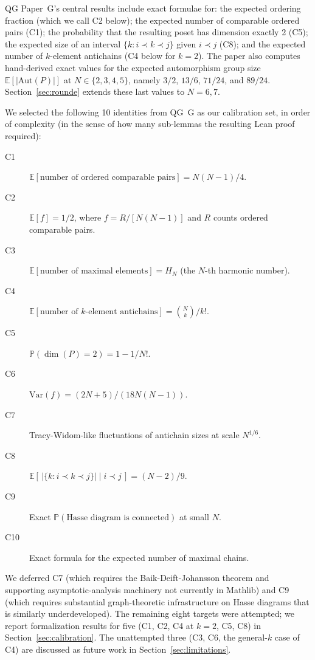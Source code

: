\documentclass[11pt]{article}
\theoremstyle{definition}
\begin{document}
QG Paper~G's central results include exact formulae for: the expected ordering
fraction (which we call C2 below); the expected number of comparable ordered pairs
(C1); the probability that the resulting poset has dimension exactly 2 (C5); the
expected size of an interval $\{ k : i \prec k \prec j \}$ given $i \prec j$ (C8);
and the expected number of $k$-element antichains (C4 below for $k = 2$). The paper
also computes hand-derived exact values for the expected automorphism group size
$\mathbb{E}[|\mathrm{Aut}(P)|]$ at $N \in \{2, 3, 4, 5\}$, namely $3/2$, $13/6$,
$71/24$, and $89/24$. Section~\ref{sec:rounde} extends these last values to $N=6, 7$.

We selected the following 10 identities from QG~G as our calibration set, in
order of complexity (in the sense of how many sub-lemmas the resulting Lean proof
required):

\begin{description}
    \item[C1] $\mathbb{E}[\text{number of ordered comparable pairs}] = N(N-1)/4$.
    \item[C2] $\mathbb{E}[f] = 1/2$, where $f = R/[N(N-1)]$ and $R$ counts ordered
    comparable pairs.
    \item[C3] $\mathbb{E}[\text{number of maximal elements}] = H_N$
    (the $N$-th harmonic number).
    \item[C4] $\mathbb{E}[\text{number of $k$-element antichains}] = \binom{N}{k}/k!$.
    \item[C5] $\mathbb{P}(\dim(P) = 2) = 1 - 1/N!$.
    \item[C6] $\mathrm{Var}(f) = (2N+5)/(18N(N-1))$.
    \item[C7] Tracy-Widom-like fluctuations of antichain sizes at scale $N^{1/6}$.
    \item[C8] $\mathbb{E}[\, |\{ k : i \prec k \prec j \}| \mid i \prec j \,] = (N-2)/9$.
    \item[C9] Exact $\mathbb{P}(\text{Hasse diagram is connected})$ at small $N$.
    \item[C10] Exact formula for the expected number of maximal chains.
\end{description}

We deferred C7 (which requires the Baik-Deift-Johansson theorem and supporting
asymptotic-analysis machinery not currently in Mathlib) and C9 (which requires
substantial graph-theoretic infrastructure on Hasse diagrams that is similarly
underdeveloped). The remaining eight targets were attempted; we report formalization
results for five (C1, C2, C4 at $k=2$, C5, C8) in Section~\ref{sec:calibration}.
The unattempted three (C3, C6, the general-$k$ case of C4) are discussed as future
work in Section~\ref{sec:limitations}.
\end{document}
